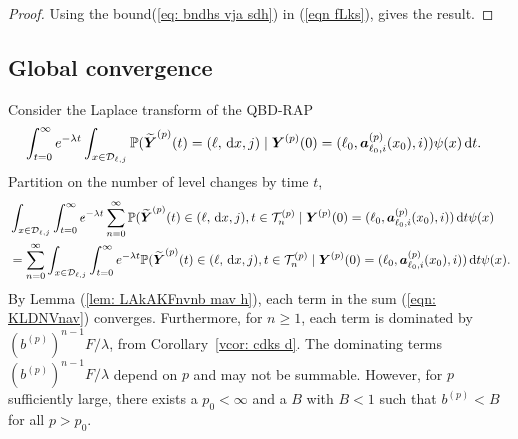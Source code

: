 \begin{proof}
	Using the bound(\ref{eq: bndhs vja sdh}) in (\ref{eqn fLks}), gives the result.  
\end{proof}

\subsection{Global convergence}
Consider the Laplace transform of the QBD-RAP 
\begin{align}
	&\int_{t=0}^\infty e^{-\lambda t}\int_{x\in\mathcal D_{\ell,j}}\mathbb P(\widetilde{\boldsymbol Y}^{(p)}(t) = (\ell,\, \mathrm{d} x,j)\mid \boldsymbol Y^{(p)}(0)=(\ell_0, \boldsymbol a_{\ell_0,i}^{(p)}(x_0), i))  \psi(x)\, \mathrm{d} t.
\end{align}
Partition on the number of level changes by time \(t\), 
\begin{align}
	&\int_{x\in\mathcal D_{\ell,j}} \int_{t=0}^\infty e^{-\lambda t}\sum_{n=0}^\infty \mathbb P( \widetilde{\boldsymbol Y}^{(p)}(t) \in (\ell, \, \mathrm{d} x, j), t\in\mathcal T_n^{(p)} \mid\nonumber 
	\boldsymbol Y^{(p)}(0)=(\ell_0, \boldsymbol  a_{\ell_0,i}^{(p)}(x_0), i))\, \mathrm{d} t \psi(x) \nonumber
	\\&=\sum_{n=0}^\infty\int_{x\in\mathcal D_{\ell,j}}\int_{t=0}^\infty e^{-\lambda t} \mathbb P(\widetilde{\boldsymbol Y}^{(p)}(t) \in (\ell, \, \mathrm{d} x, j), t\in\mathcal T_n^{(p)} \mid  
	\boldsymbol Y^{(p)}(0)=(\ell_0, \boldsymbol  a_{\ell_0,i}^{(p)}(x_0),i))\, \mathrm{d} t \psi(x) . \label{eqn: KLDNVnav}
\end{align}
By Lemma (\ref{lem: LAkAKFnvnb mav h}), each term in the sum (\ref{eqn: KLDNVnav}) converges. Furthermore, for \(n\geq 1\), each term is dominated by \(\left(b^{(p)}\right)^{n-1}F/\lambda\), from Corollary~\ref{vcor: cdks d}. The dominating terms \(\left(b^{(p)}\right)^{n-1}F/\lambda\) depend on \(p\) and may not be summable. However, for \(p\) sufficiently large, there exists a \(p_0<\infty\) and a \(B\) with \(B<1\) such that \(b^{(p)}<B\) for all \(p>p_0\).

